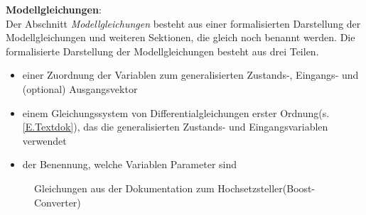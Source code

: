 \textbf{Modellgleichungen}:\\
Der Abschnitt \textit{Modellgleichungen} besteht aus einer formalisierten Darstellung der Modellgleichungen und weiteren Sektionen, die gleich noch benannt werden. Die formalisierte Darstellung der Modellgleichungen besteht aus drei Teilen.  
\begin{itemize}[label=$\bullet$]
	\item einer Zuordnung der Variablen zum generalisierten Zustands-, Eingangs- und (optional) Ausgangsvektor
	\item einem Gleichungssystem von Differentialgleichungen erster Ordnung(s. \ref{E.Textdok}), das die generalisierten Zustands- und Eingangsvariablen verwendet
	\item der Benennung, welche Variablen Parameter sind
\end{itemize} 

\begin{figure}[h]
	\centering
	\caption{Gleichungen aus der Dokumentation zum Hochsetzsteller(Boost-Converter)\protect\footnotemark}
	\label{fig:BspDok_ModelEquations}
\end{figure}

